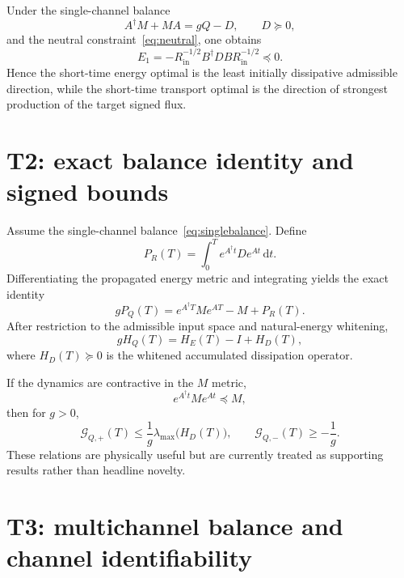 \documentclass[11pt,a4paper]{article}
\newcommand{\dd}{\mathrm{d}}
\newcommand{\la}{\lambda_{\max}}
\newcommand{\PQ}{P_Q}
\newcommand{\PR}{P_R}
\newcommand{\HQ}{H_Q}
\begin{document}
Under the single-channel balance
\begin{equation}
  A^\dagger M+MA=gQ-D,
  \qquad D\succeq0,
  \label{eq:singlebalance}
\end{equation}
and the neutral constraint~\eqref{eq:neutral}, one obtains
\begin{equation}
  E_1
  =-R_{\mathrm{in}}^{-1/2}B^\dagger DBR_{\mathrm{in}}^{-1/2}
  \preceq0.
\end{equation}
Hence the short-time energy optimal is the least initially dissipative admissible direction, while the short-time transport optimal is the direction of strongest production of the target signed flux.

\section{T2: exact balance identity and signed bounds}

Assume the single-channel balance~\eqref{eq:singlebalance}. Define
\begin{equation}
  \PR(T)=\int_0^T e^{A^\dagger t}De^{At}\,\dd t.
\end{equation}
Differentiating the propagated energy metric and integrating yields the exact identity
\begin{equation}
  g\PQ(T)
  =e^{A^\dagger T}Me^{AT}-M+\PR(T).
  \label{eq:T2identity}
\end{equation}
After restriction to the admissible input space and natural-energy whitening,
\begin{equation}
  g\HQ(T)=H_E(T)-I+H_D(T),
\end{equation}
where $H_D(T)\succeq0$ is the whitened accumulated dissipation operator.

If the dynamics are contractive in the $M$ metric,
\begin{equation}
  e^{A^\dagger t}Me^{At}\preceq M,
\end{equation}
then for $g>0$,
\begin{equation}
  \mathcal{G}_{Q,+}(T)
  \le \frac{1}{g}\la\bigl(H_D(T)\bigr),
  \qquad
  \mathcal{G}_{Q,-}(T)\ge -\frac{1}{g}.
\end{equation}
These relations are physically useful but are currently treated as supporting results rather than headline novelty.

\section{T3: multichannel balance and channel identifiability}
\end{document}
